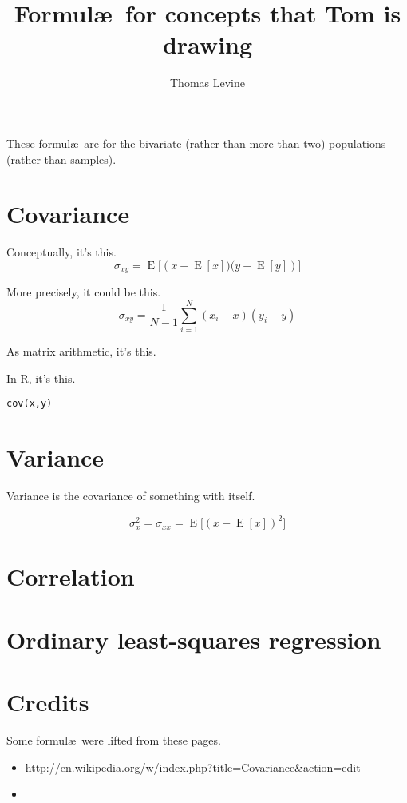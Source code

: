 \documentclass{article}
\title{Formul\ae\ for concepts that Tom is drawing}
\author{Thomas Levine}
\begin{document}
\maketitle

These formul\ae\ are for the bivariate (rather than more-than-two) populations (rather than samples).

\section{Covariance}
Conceptually, it's this.
$$\sigma_{xy} = \operatorname{E}{\big[\left(x - \operatorname{E}[x])(y - \operatorname{E}[y]\right)\big]} $$

More precisely, it could be this.
$$\sigma_{xy} = \frac{1}{N-1}\sum_{i=1}^{N}\left( x_{i}-\bar{x} \right) \left( y_{i}-\bar{y} \right) $$

As matrix arithmetic, it's this.

In R, it's this.

\begin{verbatim}
cov(x,y)
\end{verbatim}

\section{Variance}
Variance is the covariance of something with itself.

$$ \sigma_{x}^2 = \sigma_{xx} = \operatorname{E}{\big[\left(x - \operatorname{E}[x]\right)^2\big]} $$

\section{Correlation}
\section{Ordinary least-squares regression}

\section{Credits}
Some formul\ae\ were lifted from these pages.
\begin{itemize}
\item \url{http://en.wikipedia.org/w/index.php?title=Covariance&action=edit}
\item \url{}
\end{itemize}
\end{document}
